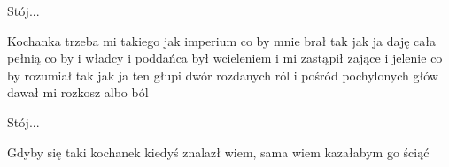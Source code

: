 \documentclass[../../../songbook.tex]{subfiles}
\begin{document}
\-\hspace{1cm} Stój...		 \newline

Kochanka trzeba mi takiego jak imperium 		 \newline
co by mnie brał tak jak ja daję cała pełnią 		 \newline
co by i władcy i poddańca był wcieleniem 		 \newline
i mi zastąpił zające i jelenie 		 \newline
co by rozumiał tak jak ja 		 \newline
ten głupi dwór rozdanych ról 		 \newline
i pośród pochylonych głów 		 \newline
dawał mi rozkosz albo ból 		 \newline

\-\hspace{1cm} Stój...		 \newline

\-\hspace{1cm} Gdyby się taki		 \newline
\-\hspace{1cm} kochanek kiedyś znalazł		 \newline
\-\hspace{1cm} wiem, sama wiem 		 \newline
\-\hspace{1cm} kazałabym go ściąć 		
\end{document}
